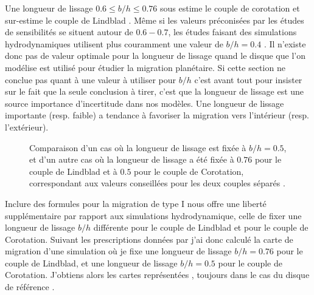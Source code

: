 Une longueur de lissage $0.6 \leqslant b/h \leqslant 0.76$ sous estime le couple de corotation et sur-estime le couple de
Lindblad \citep{masset2002coorbital}. Même si les valeurs préconisées par les études de sensibilités se situent autour de
$0.6-0.7$, les études faisant des simulations hydrodynamiques utilisent plus couramment une valeur de $b/h=0.4$
\citep{paardekooper2011torque}. Il n'existe donc pas de valeur optimale pour la longueur de lissage quand le disque que l'on
modélise est utilisé pour étudier la migration planétaire. Si cette section ne conclue pas quant à une valeur à utiliser pour
$b/h$ c'est avant tout pour insister sur le fait que la seule conclusion à tirer, c'est que la longueur de lissage est une
source importance d'incertitude dans nos modèles. Une longueur de lissage importante (resp. faible) a tendance à favoriser la
migration vers l'intérieur (resp. l'extérieur). 

\begin{figure}[htb]
\centering
{}\hfill
{}
\caption{Comparaison d'un cas où la longueur de lissage est fixée à $b/h=0.5$, et d'un autre cas où la longueur de lissage a été
fixée à $0.76$ pour le couple de Lindblad et à $0.5$ pour le couple de Corotation, correspondant aux valeurs conseillées pour
les deux couples séparés \citep{masset2002coorbital}. }\label{fig:modified_smoothing}
\end{figure}

Inclure des formules pour la migration de type I nous offre une liberté supplémentaire par rapport aux simulations
hydrodynamique, celle de fixer une longueur de lissage $b/h$ différente pour le couple de Lindblad et pour le couple de
Corotation. Suivant les prescriptions données par \cite{masset2002coorbital} j'ai donc calculé la carte de migration d'une
simulation où je fixe une longueur de lissage $b/h=0.76$ pour le couple de Lindblad, et une longueur de lissage $b/h=0.5$ pour
le couple de Corotation. J'obtiens alors les cartes représentées , toujours dans le cas du disque
de référence . 

